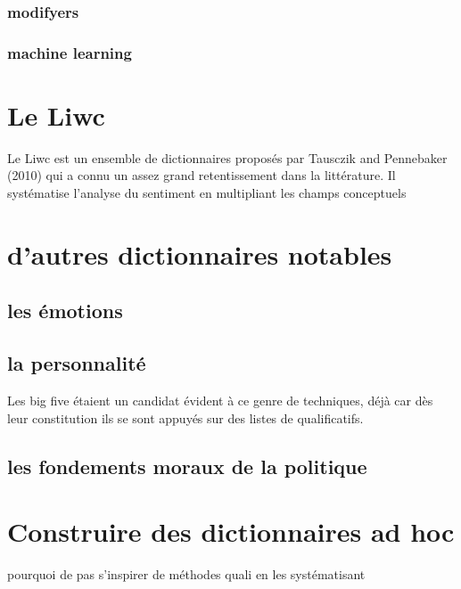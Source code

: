 \documentclass[
  letterpaper,
  DIV=11,
  numbers=noendperiod]{scrreprt}
\begin{document}
\subsubsection{modifyers}\label{modifyers}

\subsubsection{machine learning}\label{machine-learning}

\section{Le Liwc}\label{le-liwc}

Le Liwc est un ensemble de dictionnaires proposés par Tausczik and
Pennebaker (2010) qui a connu un assez grand retentissement dans la
littérature. Il systématise l'analyse du sentiment en multipliant les
champs conceptuels

\section{d'autres dictionnaires
notables}\label{dautres-dictionnaires-notables}

\subsection{les émotions}\label{les-uxe9motions}

\subsection{la personnalité}\label{la-personnalituxe9}

Les big five étaient un candidat évident à ce genre de techniques, déjà
car dès leur constitution ils se sont appuyés sur des listes de
qualificatifs.

\subsection{les fondements moraux de la
politique}\label{les-fondements-moraux-de-la-politique}

\section{Construire des dictionnaires ad
hoc}\label{construire-des-dictionnaires-ad-hoc}

pourquoi de pas s'inspirer de méthodes quali en les systématisant
\end{document}
